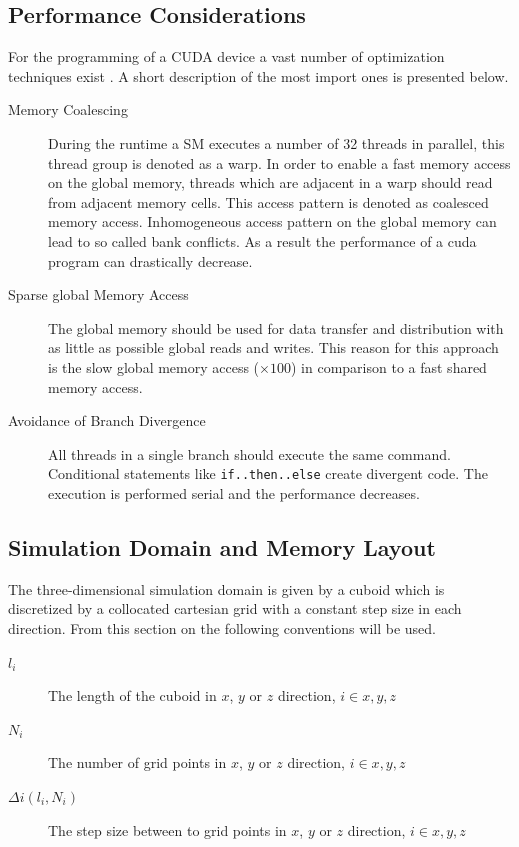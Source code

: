 \subsection{Performance Considerations}
\label{cuda:sec_performance}

For the programming of a CUDA device a vast number of optimization techniques exist \citep{CUDABP}.
A  short description of the most import ones is presented below.

\begin{description}
    \item[Memory Coalescing]
        During the runtime a SM executes a number of 32 threads in parallel, this thread group is denoted as a warp.
        In order to enable a fast memory access on the global memory, threads which are adjacent in a warp should read from adjacent memory cells.
        This access pattern is denoted as coalesced memory access. Inhomogeneous access pattern on the global memory can lead to so called bank
        conflicts. As a result the performance of a cuda program can drastically decrease.

    \item[Sparse global Memory Access]
        The global memory should be used for data transfer and distribution with as little as possible global reads and writes.
        This reason for this approach is the slow global memory access ($\times 100$) in comparison to a fast shared memory access.

    \item[Avoidance of Branch Divergence] All threads in a single branch should execute the same command.
                              Conditional statements like \texttt{if..then..else} create divergent code.
                              The execution is performed serial and the performance decreases.
\end{description}


\subsection{Simulation Domain and  Memory Layout}

The three-dimensional simulation domain is given by a cuboid which is discretized by a
collocated cartesian grid with a constant step size in each direction.
From this section on the following conventions will be used.

\begin{description}
    \item[$l_i$] The length of the cuboid in $x$, $y$ or $z$ direction, $i\in{x, y, z}$
    \item[$N_i$] The number of grid points in $x$, $y$ or $z$ direction, $i\in{x, y, z}$
    \item[$\Delta i(l_i, N_i)$] The step size between to grid points in $x$, $y$ or $z$ direction, $i\in{x, y, z}$
\end{description}

